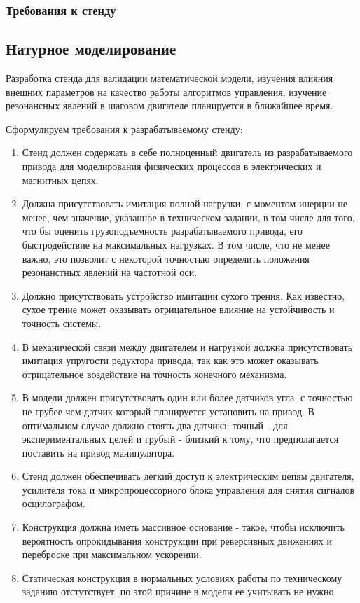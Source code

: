 \ifdefined\DIPLOMA
    \subsubsection{Требования к стенду}
\else
    \subsection{Натурное моделирование}
    Разработка стенда для валидации математической модели, изучения влияния внешних параметров
    на качество работы алгоритмов управления, изучение резонансных явлений в шаговом
    двигателе планируется в ближайшее время.

    Сформулируем требования к разрабатываемому стенду:
\fi

\begin{enumerate}
    \item Стенд должен содержать в себе полноценный двигатель из разрабатываемого
    привода для моделирования физических процессов в электрических и магнитных цепях.

    \item Должна присутствовать имитация полной нагрузки, с моментом инерции не менее, чем
    значение, указанное в техническом задании, в том числе для того, что бы оценить
    грузоподъемность разрабатываемого привода, его быстродействие на максимальных
    нагрузках. В том числе, что не менее важно, это позволит с некоторой точностью
    определить положения резонанстных явлений на частотной оси.

    \item Должно присутствовать устройство имитации сухого трения. Как
    известно, сухое трение может оказывать отрицательное влияние на устойчивость
    и точность системы.

    \item В механической связи между двигателем и нагрузкой должна присутствовать имитация
    упругости редуктора привода, так как это может оказывать отрицательное воздействие
    на точность конечного механизма.

    \item В модели должен присутствовать один или более датчиков угла, с точностью не
    грубее чем датчик который планируется установить на привод. В оптимальном случае должно
    стоять два датчика: точный - для экспериментальных целей и грубый - близкий
    к тому, что предполагается поставить на привод манипулятора.

    \item Стенд должен обеспечивать легкий доступ к электрическим цепям двигателя,
    усилителя тока и микропроцессорного блока управления для снятия сигналов
    осцилографом.

    \item Конструкция должна иметь массивное основание - такое, чтобы
    исключить вероятность опрокидывания конструкции при реверсивных движениях
    и переброске при максимальном ускорении.

    \item Статическая конструкция в нормальных условиях работы по техническому
    заданию отстутствует, по этой причине в модели ее учитывать не нужно.
\end{enumerate}

\endinput

